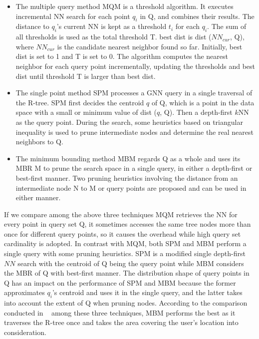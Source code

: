 \begin{itemize}
\item The multiple query method MQM is a threshold algorithm. It executes incremental NN search for each point $q_{i}$ in Q, and combines their results. The distance to $q_{i}$'s current NN is kept as a threshold $t_{i}$ for each $q_{i}$. The sum of all thresholds is used as the total threshold T. best dist is dist ($NN_{cur}$, Q), where $NN_{cur}$ is the candidate nearest neighbor found so far. Initially, best dist is set to 1 and T is set to 0. The algorithm computes the nearest neighbor for each query point incrementally, updating the thresholds and best dist until threshold T is larger than best dist.

\item The single point method SPM processes a GNN query in a single traversal of the R-tree. SPM first decides the centroid $q$ of Q, which is a point in the data space with a small or minimum value of dist ($q$, Q). Then a depth-first $k$NN as the query point. During the search, some heuristics based on triangular inequality is used to prune intermediate nodes and determine the real nearest neighbors to Q.

\item The minimum bounding method MBM regards Q as a whole and uses its MBR M to prune the search space in a single query, in either a depth-first or best-first manner. Two pruning heuristics involving the distance from an intermediate node N to M or query points are proposed and can be used in either manner.
\end{itemize}


If we compare among the above three techniques MQM retrieves the NN for every point in query set Q, it sometimes accesses the same tree nodes more than once for different query points, so it causes the overhead while high query set cardinality is adopted. In contrast with MQM, both SPM and MBM perform a single query with some pruning heuristics. SPM is a modified single depth-first $NN$ search with the centroid of Q being the query point while MBM considers the MBR of Q with best-first manner. The distribution shape of query points in Q has an impact on the performance of SPM and MBM because the former approximates $q_{i}$'s centroid and uses it in the single query, and the latter takes into account the extent of Q when pruning nodes. According to the comparison conducted in ~\cite{gnn:papa} among these three techniques, MBM performs the best as it traverses the R-tree once and takes the area covering the user's location into consideration.

